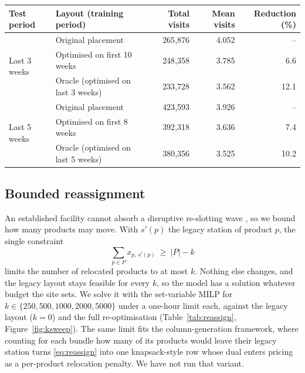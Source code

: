 \documentclass[]{interact}
\begin{document}
\begin{table}[H]
\centering
{}
{\begin{tabular*}{\textwidth}{@{\extracolsep{\fill}}llrrr@{}}
\toprule
Test period & Layout (training period) & Total visits & Mean visits & Reduction (\%) \\
\midrule
\multirow{3}{*}{Last 3 weeks}
 & Original placement & 265{,}876 & 4.052 & -- \\
 & Optimised on first 10 weeks & 248{,}358 & 3.785 & 6.6 \\
 & Oracle (optimised on last 3 weeks) & 233{,}728 & 3.562 & 12.1 \\
\midrule
\multirow{3}{*}{Last 5 weeks}
 & Original placement & 423{,}593 & 3.926 & -- \\
 & Optimised on first 8 weeks & 392{,}318 & 3.636 & 7.4 \\
 & Oracle (optimised on last 5 weeks) & 380{,}356 & 3.525 & 10.2 \\
\bottomrule
\end{tabular*}}
\label{tab:temporal}
\end{table}

\subsection{Bounded reassignment}\label{sec:reassign}
An established facility cannot absorb a disruptive re-slotting wave \citep{chabot2024reassignment}, so we bound how many products may move. With $s'(p)$ the legacy station of product $p$, the single constraint
\begin{equation}
\sum_{p \in P} x_{p,\,s'(p)} \ \ge\ |P| - k
\label{eq:reassign}
\end{equation}
limits the number of relocated products to at most $k$. Nothing else changes, and the legacy layout stays feasible for every $k$, so the model has a solution whatever budget the site sets. We solve it with the set-variable MILP for $k \in \{250, 500, 1000, 2000, 5000\}$ under a one-hour limit each, against the legacy layout ($k=0$) and the full re-optimisation (Table~\ref{tab:reassign}, Figure~\ref{fig:ksweep}). The same limit fits the column-generation framework, where counting for each bundle how many of its products would leave their legacy station turns \eqref{eq:reassign} into one knapsack-style row whose dual enters pricing as a per-product relocation penalty. We have not run that variant.
\end{document}
